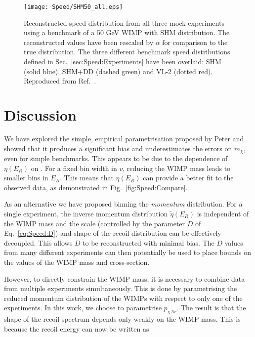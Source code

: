  \begin{figure}[t]
\centering
\texttt{[image: Speed/SHM50\_all.eps]}
\caption[Reconstructed speed distribution from all three mock experiments for a 50 GeV WIMP with SHM distribution. All three benchmark distributions are shown for comparison.]{Reconstructed speed distribution from all three mock experiments using a benchmark of a 50 GeV WIMP with SHM distribution. The reconstructed values have been rescaled by \(\alpha\) for comparison to the true distribution. The three different benchmark speed distributions defined in Sec.\ \ref{sec:Speed:Experiments} have been overlaid: SHM (solid blue), SHM+DD (dashed green) and VL-2 (dotted red). Reproduced from Ref.~\cite{Kavanagh:2012}.}
  \label{fig:Speed:SHM50_all}
\end{figure}


\section{Discussion}
\label{sec:Speed:discussion}
We have explored the simple, empirical parametrisation proposed by Peter and showed that it produces a significant bias and underestimates the errors on $m_\chi$, even for simple benchmarks. This appears to be due to the dependence of $\eta(E_R)$ on \mchi. For a fixed bin width in $v$, reducing the WIMP mass leads to smaller bins in $E_R$. This means that $\eta(E_R)$ can provide a better fit to the observed data, as demonstrated in Fig.~\ref{fig:Speed:Compare}.

As an alternative we have proposed binning the \textit{momentum} distribution. For a single experiment, the inverse momentum distribution $\tilde{\eta}(E_R)$ is independent of the WIMP mass and the scale (controlled by the parameter $D$ of Eq.~\ref{eq:Speed:D}) and shape of the recoil distribution can be effectively decoupled. This allows $D$ to be reconstructed with minimal bias. The $D$ values from many different experiments can then potentially be used to place bounds on the values of the WIMP mass and cross-section.

However, to directly constrain the WIMP mass, it is necessary to combine data from multiple experiments simultaneously. This is done by parametrising the reduced momentum distribution of the WIMPs with respect to only one of the experiments. In this work, we choose to parametrise $p_{\chi Ar}$. The result is that the shape of the recoil spectrum depends only weakly on the WIMP mass. This is because the recoil energy can now be written as

